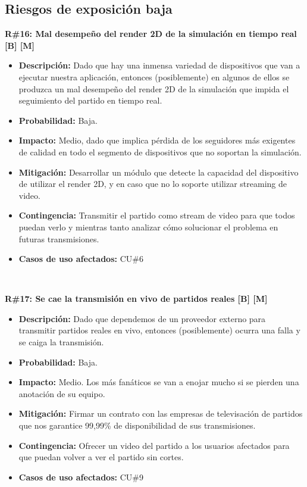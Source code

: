 \subsection{Riesgos de exposición baja}

\noindent\textbf{R\#16: Mal desempeño del render 2D de la simulación en tiempo real [B] [M] } 
\begin{itemize}
	\item{\textbf{Descripción:} Dado que hay una inmensa variedad de dispositivos que van a ejecutar nuestra aplicación, entonces (posiblemente) en algunos de ellos se produzca un mal desempeño del render 2D de la simulación que impida el seguimiento del partido en tiempo real.}
	\item{\textbf{Probabilidad:} Baja.}
	\item{\textbf{Impacto:} Medio, dado que implica pérdida de los seguidores más exigentes de calidad en todo el segmento de dispositivos que no soportan la simulación.}
	\item{\textbf{Mitigación:} Desarrollar un módulo que detecte la capacidad del dispositivo de utilizar el render 2D, y en caso que no lo soporte utilizar streaming de video.}
	\item{\textbf{Contingencia:} Transmitir el partido como stream de video para que todos puedan verlo y mientras tanto analizar cómo solucionar el problema en futuras transmisiones.}
	\item{\textbf{Casos de uso afectados:} CU\#6}
\end{itemize}

~

\noindent\textbf{R\#17: Se cae la transmisión en vivo de partidos reales [B] [M]} 
\begin{itemize}
	\item{\textbf{Descripción:} Dado que dependemos de un proveedor externo para transmitir partidos reales en vivo, entonces (posiblemente) ocurra una falla y se caiga la transmisión.}
	\item{\textbf{Probabilidad:} Baja.}
	\item{\textbf{Impacto:} Medio. Los más fanáticos se van a enojar mucho si se pierden una anotación de su equipo.}
	\item{\textbf{Mitigación:} Firmar un contrato con las empresas de televisación de partidos que nos garantice 99,99\% de disponibilidad de sus transmisiones.}
	\item{\textbf{Contingencia:} Ofrecer un video del partido a los usuarios afectados para que puedan volver a ver el partido sin cortes.}
	\item{\textbf{Casos de uso afectados:} CU\#9}
\end{itemize}

